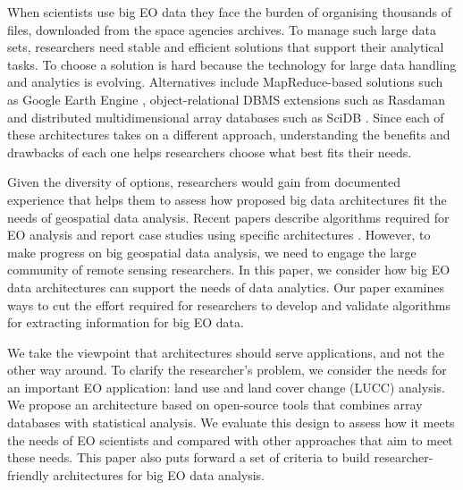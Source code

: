 \documentclass[a4paper, 11pt]{article}
\begin{document}
When scientists use big EO data they face the burden of organising thousands of files, downloaded from the space agencies archives. To manage such large data sets, researchers need stable and efficient solutions that support their analytical tasks. To choose a solution is hard because the technology for large data handling and analytics is evolving. Alternatives include MapReduce-based solutions such as Google Earth Engine \cite{Gorelick2012}, object-relational DBMS extensions such as Rasdaman \cite{Baumann1998} and  distributed multidimensional array databases such as SciDB \cite{Stonebraker2013}. Since each of these architectures takes on a different approach, understanding the benefits and drawbacks of each one helps researchers choose what best fits their needs.

Given the diversity of options, researchers would gain from documented experience that helps them to assess how proposed big data architectures fit the needs of geospatial data analysis. Recent papers describe algorithms required for EO analysis \cite{Vatsavai2012} \cite{Nativi2015} and report case studies using specific architectures \cite{Planthaber2012}\cite{Krcal2015}. However, to make progress on big geospatial data analysis, we need to engage the large community of remote sensing researchers. In this paper, we consider how big EO data architectures can support the needs of data analytics. Our paper examines ways to cut the effort required for researchers to develop and validate algorithms for extracting information for big EO data.

We take the viewpoint that architectures should serve applications, and not the other way around. To clarify the researcher's problem, we consider the needs for an important EO application: land use and land cover change (LUCC) analysis. We propose an architecture based on open-source tools that combines array databases with statistical analysis.  We evaluate this design to assess how it meets the needs of EO scientists and compared with other approaches that aim to meet these needs. This paper also puts forward a set of criteria to build researcher-friendly architectures for big EO data analysis.
\printbibliography
\end{document}
